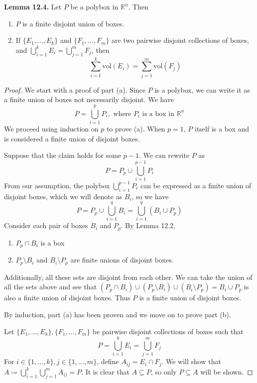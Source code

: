 \documentclass{article}
\theoremstyle{plain} %
\numberwithin{thm}{section} %
\theoremstyle{definition}
\begin{document}
    \noindent\textbf{Lemma 12.4.} Let \(P\) be a polybox in \(\mathbb{R}^n\). Then
    \begin{enumerate}
        \item \(P\) is a finite disjoint union of boxes.
        \item If \(\{ E_1, ..., E_k \} \) and \(\{ F_1, ..., F_m \}\) are two pairwise disjoint collections of boxes, and \(\bigcup_{i=1}^{k} E_i = \bigcup_{j=1}^{m} F_j\), then
        \[
            \sum_{i=1}^{k} \mathrm{vol} (E_i) = \sum_{j=1}^{m} \mathrm{vol} (F_j)
        \]
    \end{enumerate}
    \begin{proof}
        We start with a proof of part (a). Since \(P\) is a polybox, we can write it as a finite union of boxes not necessarily disjoint. We have
        \[
            P = \bigcup_{i=1}^{p} P_i, \text{ where } P_i \text{ is a box in } \mathbb{R}^n
        \]
        We proceed using induction on \(p\) to prove (a). When \(p = 1\), \(P\) itself is a box and is considered a finite union of disjoint boxes.

        Suppose that the claim holds for some \(p - 1\). We can rewrite \(P\) as
        \[
            P = P_p \cup \bigcup_{i=1}^{p-1} P_i
        \]
        From our assumption, the polybox \(\bigcup_{i=1}^{p-1} P_i\) can be expressed as a finite union of disjoint boxes, which we will denote as \(B_i\), so we have
        \[
            P = P_p \cup \bigcup_{i=1}^{q} B_i = \bigcup_{i=1}^{q} (B_i \cup P_p)
        \]
        Consider each pair of boxes \(B_i\) and \(P_p\). By Lemma 12.2,
        \begin{enumerate}
            \item \(P_p \cap B_i\) is a box
            \item \(P_p \setminus B_i\) and \(B_i \setminus P_p\) are finite unions of disjoint boxes.
        \end{enumerate}
        Additionally, all these sets are disjoint from each other. We can take the union of all the sets above and see that \((P_p \cap B_i) \cup (P_p \setminus B_i) \cup (B_i \setminus P_p) = B_i \cup P_p\) is also a finite union of disjoint boxes. Thus \(P\) is a finite union of disjoint boxes.

        By induction, part (a) has been proven and we move on to prove part (b).

        \medbreak

        \noindent Let \(\{ E_1, ..., E_k \}, \{F_1, ..., F_m \}\) be pairwise disjoint collections of boxes such that
        \[
            P = \bigcup_{i=1}^{k} E_i = \bigcup_{j=1}^{m} F_j
        \]
        For \(i \in \{ 1, ..., k \}, j \in \{1, ..., m\}\), define \(A_{ij} = E_i \cap F_j\). We will show that \(A \coloneqq \bigcup_{i=1}^{k} \bigcup_{j=1}^{m} A_{ij} = P\). It is clear that \(A \subseteq P\), so only \(P \subseteq A\) will be shown.


\end{proof}
\end{document}
